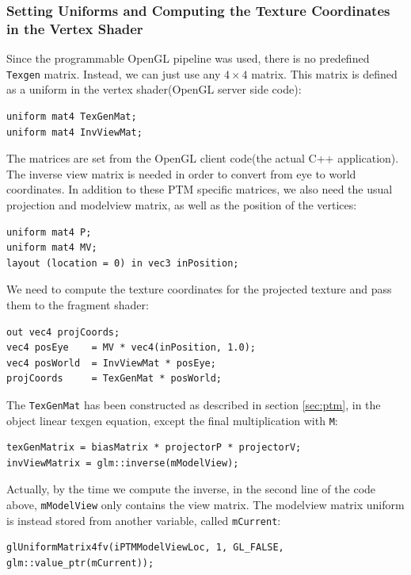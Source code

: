 \documentclass[]{article}
\begin{document}
\subsubsection{Setting Uniforms and Computing the Texture Coordinates in the Vertex Shader}

Since the programmable OpenGL pipeline was used, there is no predefined \verb|Texgen| matrix. Instead, we can just use any $4 \times 4$ matrix. This matrix is defined as a uniform in the vertex shader(OpenGL server side code):
\begin{verbatim}
uniform mat4 TexGenMat;
uniform mat4 InvViewMat;
\end{verbatim}

The matrices are set from the OpenGL client code(the actual C++ application). The inverse view matrix is needed in order to convert from eye to world coordinates. In addition to these PTM specific matrices, we also need the usual projection and modelview matrix, as well as the position of the vertices:
\begin{verbatim}
uniform mat4 P;
uniform mat4 MV;
layout (location = 0) in vec3 inPosition;
\end{verbatim}

We need to compute the texture coordinates for the projected texture and pass them to the fragment shader:
\begin{verbatim}
out vec4 projCoords;
vec4 posEye    = MV * vec4(inPosition, 1.0);
vec4 posWorld  = InvViewMat * posEye;
projCoords     = TexGenMat * posWorld;
\end{verbatim}

The \verb|TexGenMat| has been constructed as described in section \ref{sec:ptm}, in the object linear texgen equation, except the final multiplication with \verb|M|:
\begin{verbatim}
texGenMatrix = biasMatrix * projectorP * projectorV;
invViewMatrix = glm::inverse(mModelView);
\end{verbatim} 

Actually, by the time we compute the inverse, in the second line of the code above, \verb|mModelView| only contains the view matrix. The modelview matrix uniform is instead stored from another variable, called \verb|mCurrent|:
\begin{verbatim}
glUniformMatrix4fv(iPTMModelViewLoc, 1, GL_FALSE, glm::value_ptr(mCurrent));
\end{verbatim}
\end{document}
